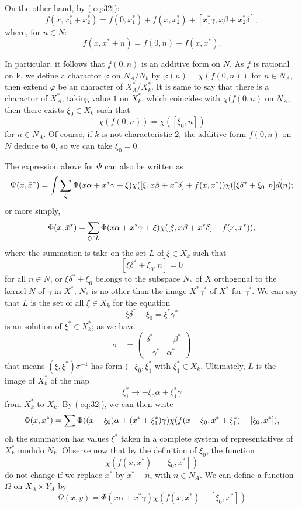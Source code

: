 \documentclass[12pt]{amsart}
\begin{document}
On the other hand, by (\ref{eq:32}):
\[
f(x,x_1^*+x_2^*)=f(0,x_1^*)+f(x,x_2^*) + [x^*_1\gamma, x \beta +x_2^*\delta],
\]
where, for $n\in N$:
\[
f(x, x^*+n)=f(0,n)+f(x,x^*).
\]

In particular,  it follows that $f(0, n)$ is an additive form on $N$.
As $f$ is rational on k, we define a charactor $\varphi$ on $N_A/N_k$ 
by $\varphi(\dot{n})=\chi(f(0,n))$ for $n\in N_A$, 
then extend $\varphi$ be an character of $X_A^*/X_k^*$. It is same to 
say that there is a charactor of $X^*_A$, taking value $1$ on $X_k^*$,
which coincides with $\chi(f(0,n)$ on $N_A$, then there exists 
$\xi_0\in X_k$ such that 
\[
\chi(f(0,n)) = \chi([\xi_0,n])
\] 
for $n\in N_A$. Of course, if $k$ is not characteristic $2$, the 
additive form $f(0,n)$ on $N$ deduce to $0$, so we can take $\xi_0=0$.

The expression above for $\Phi$ can also be written as 
\[
\Psi(x, {\bar{x}}^*)=\int \sum_{\xi} \Phi(x\alpha + x^*\gamma+\xi)
\chi([\xi, x\beta+x^*\delta]+f(x, x^*))\chi([\xi\delta^*+\xi_0,n]d\dot(n);
\]
or more simply, 
\[
\Phi(x, {\bar{x}}^*) = \sum_{\xi\in L} \Phi(x\alpha + x^*\gamma+\xi)
\chi([\xi, x\beta+x^*\delta]+f(x,x^*)),
\]
where the summation is take on the set $L$ of $\xi \in X_k$ such that 
\[
[\xi\delta^*+\xi_0,n] = 0
\]
for all $n\in N$, or $\xi\delta^*+\xi_0$ belongs to the subspace $N_*$ 
of $X$ orthogonal to the kernel $N$ of $\gamma$ in $X^*$; $N_*$ is no other
than the image $X^*\gamma^*$ of $X^*$ for $\gamma^*$. 
We can say that $L$ is the set of all $\xi\in X_k$ for the equation
\[
\xi \delta^*+\xi_0=\xi^*\gamma^*
\] 
is an solution of $\xi^*\in X^*_k$; as we have 
\[
\sigma^{-1} = \begin{pmatrix} \delta^* & -\beta^* \\ -\gamma^* & \alpha^*
\end{pmatrix}
\]
that means $(\xi, \xi^*)\sigma^{-1}$ has form $(-\xi_0, \xi_1^*$ 
with $\xi_1^*\in X_k$. 
Ultimately, $L$ is the image of $X^*_k$ of the map 
\[
\xi_1^* \to -\xi_0\alpha + \xi_1^*\gamma
\] 
from $X^*_k$ to $X_k$.
By (\ref{eq:32}), we can then write
\[
\Phi(x, {\bar{x}}^*) = \sum \Phi((x-\xi_0)\alpha+(x^*+\xi_1^*)\gamma)
\chi(f(x-\xi_0, x^*+\xi^*_1)-[\xi_0,x^*]),
\]
oh the summation has values $\xi^*$ taken in a complete system of 
representatives of $X_k^*$ modulo $N_k$.  
Observe now that by the definition of $\xi_0$, 
the function
\[
\chi(f(x,x^*)-[\xi_0,x^*])
\]
do not change if we replace $x^*$ by $x^*+n$, with $n\in N_A$.
We can define a function $\Omega$ on $X_A\times Y_A$ by 
\[
\Omega(x,y)=\Phi(x\alpha+x^*\gamma)\chi(f(x,x^*)-[\xi_0,x^*])
\]
\end{document}
